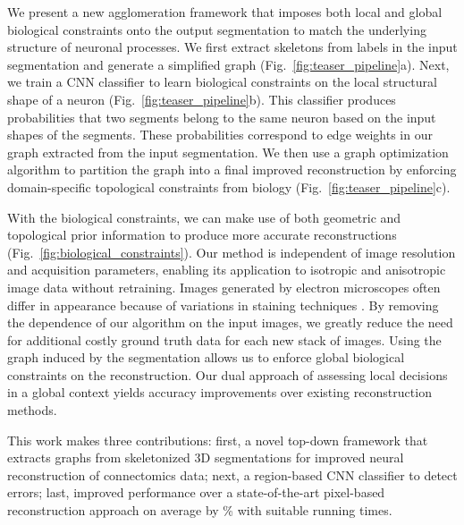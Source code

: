 We present a new agglomeration framework that imposes both local and global biological constraints onto the output segmentation to match the underlying structure of neuronal processes.
We first extract skeletons from labels in the input segmentation and generate a simplified graph (Fig.~\ref{fig:teaser_pipeline}a). 
Next, we train a CNN classifier to learn biological constraints on the local structural shape of a neuron (Fig.~\ref{fig:teaser_pipeline}b). 
This classifier produces probabilities that two segments belong to the same neuron based on the input shapes of the segments.
These probabilities correspond to edge weights in our graph extracted from the input segmentation.
We then use a graph optimization algorithm to partition the graph into a final improved reconstruction by enforcing domain-specific topological constraints from biology (Fig.~\ref{fig:teaser_pipeline}c).

With the biological constraints, we can make use of both geometric and topological prior information to produce more accurate reconstructions (Fig.~\ref{fig:biological_constraints}).
Our method is independent of image resolution and acquisition parameters, enabling its application to isotropic and anisotropic image data without retraining.
Images generated by electron microscopes often differ in appearance because of variations in staining techniques \cite{briggman2012volume}.
By removing the dependence of our algorithm on the input images, we greatly reduce the need for additional costly ground truth data for each new stack of images.
Using the graph induced by the segmentation allows us to enforce global biological constraints on the reconstruction. 
Our dual approach of assessing local decisions in a global context yields accuracy improvements over existing reconstruction methods.


This work makes three contributions:
first, a novel top-down framework that extracts graphs from skeletonized 3D segmentations for improved neural reconstruction of connectomics data; 
next, a region-based CNN classifier to detect errors; 
last, improved performance over a state-of-the-art pixel-based reconstruction approach on average by \% with suitable running times.
